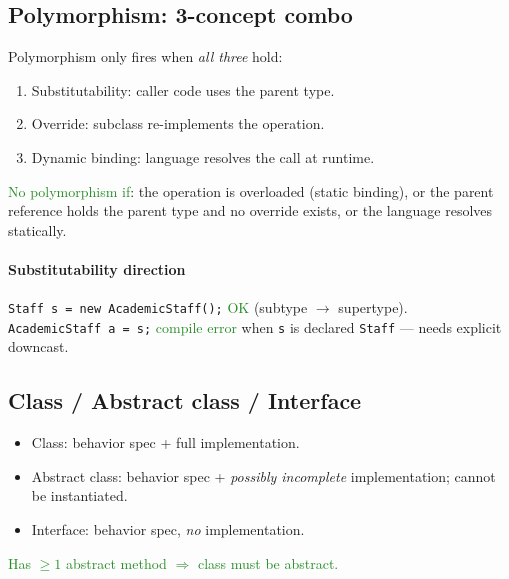 \subsection{Polymorphism: 3-concept combo}
Polymorphism only fires when \emph{all three} hold:
\begin{enumerate}
  \item \textcolor{Bittersweet}{Substitutability}: caller code uses the parent type.
  \item \textcolor{Bittersweet}{Override}: subclass re-implements the operation.
  \item \textcolor{Bittersweet}{Dynamic binding}: language resolves the call at runtime.
\end{enumerate}
\textcolor{ForestGreen}{No polymorphism if}: the operation is overloaded (static binding), or the parent reference holds the parent type and no override exists, or the language resolves statically.

\paragraph{Substitutability direction}
\texttt{Staff s = new AcademicStaff();} \textcolor{ForestGreen}{OK} (subtype $\to$ supertype).\\
\texttt{AcademicStaff a = s;} \textcolor{ForestGreen}{compile error} when \texttt{s} is declared \texttt{Staff} — needs explicit downcast.

\subsection{Class / Abstract class / Interface}
\begin{itemize}
  \item \textcolor{Bittersweet}{Class}: behavior spec + full implementation.
  \item \textcolor{Bittersweet}{Abstract class}: behavior spec + \emph{possibly incomplete} implementation; cannot be instantiated.
  \item \textcolor{Bittersweet}{Interface}: behavior spec, \emph{no} implementation.
\end{itemize}
\textcolor{ForestGreen}{Has $\ge 1$ abstract method $\Rightarrow$ class must be abstract.}

